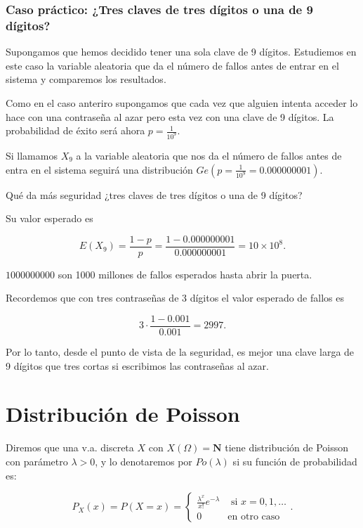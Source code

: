 \documentclass[
  letterpaper,
  DIV=11,
  numbers=noendperiod]{scrreprt}
\begin{document}
\subsubsection{Caso práctico: ¿Tres claves de tres dígitos o una de 9
dígitos?}\label{caso-pruxe1ctico-tres-claves-de-tres-duxedgitos-o-una-de-9-duxedgitos}

Supongamos que hemos decidido tener una sola clave de 9 dígitos.
Estudiemos en este caso la variable aleatoria que da el número de fallos
antes de entrar en el sistema y comparemos los resultados.

Como en el caso anteriro supongamos que cada vez que alguien intenta
acceder lo hace con una contraseña al azar pero esta vez con una clave
de 9 dígitos. La probabilidad de éxito será ahora
\(p=\frac{1}{10^{9}}\).

Si llamamos \(X_9\) a la variable aleatoria que nos da el número de
fallos antes de entra en el sistema seguirá una distribución
\(Ge(p=\frac{1}{10^9}=0.000000001)\).

Qué da más seguridad ¿tres claves de tres dígitos o una de 9 dígitos?

Su valor esperado es

\[
E(X_9)=\frac{1-p}{p}=
\frac{1-0.000000001}{0.000000001}=\ensuremath{10\times 10^{8}}.
\]

\(1000 000 000\) son 1000 millones de fallos esperados hasta abrir la
puerta.

Recordemos que con tres contraseñas de 3 dígitos el valor esperado de
fallos es

\[3\cdot \frac{1-0.001}{0.001}=2997.\]

Por lo tanto, desde el punto de vista de la seguridad, es mejor una
clave larga de 9 dígitos que tres cortas si escribimos las contraseñas
al azar.

\section{Distribución de Poisson}\label{distribuciuxf3n-de-poisson}

Diremos que una v.a. discreta \(X\) con \(X(\Omega)=\mathbf{N}\) tiene
distribución de Poisson con parámetro \(\lambda>0\), y lo denotaremos
por \(Po(\lambda)\) si su función de probabilidad es:

\[
P_{X}(x)=P(X=x)=
\left\{\begin{array}{ll}
\frac{\lambda^x}{x!} e^{-\lambda}& \mbox{ si } x=0,1,\ldots\\
0 & \mbox{en otro caso}\end{array}\right..
\]
\end{document}
